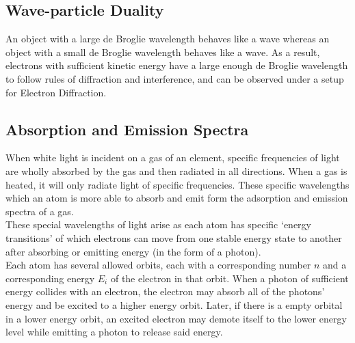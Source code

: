 \documentclass[../main]{subfiles}
\begin{document}
	\subsection{Wave-particle Duality}


	An object with a large de Broglie wavelength behaves like a wave whereas an object with a small de Broglie wavelength behaves like a wave. As a result, electrons with sufficient kinetic energy have a large enough de Broglie wavelength to follow rules of diffraction and interference, and can be observed under a setup for Electron Diffraction.

	\subsection{Absorption and Emission Spectra}

	When white light is incident on a gas of an element, specific frequencies of light are wholly absorbed by the gas and then radiated in all directions. When a gas is heated, it will only radiate light of specific frequencies. These specific wavelengths which an atom is more able to absorb and emit form the adsorption and emission spectra of a gas. \\

	These special wavelengths of light arise as each atom has specific `energy transitions' of which electrons can move from one stable energy state to another after absorbing or emitting energy (in the form of a photon). \\

	Each atom has several allowed orbits, each with a corresponding number \(n\) and a corresponding energy \(E_i\) of the electron in that orbit. When a photon of sufficient energy collides with an electron, the electron may absorb all of the photons' energy and be excited to a higher energy orbit. Later, if there is a empty orbital in a lower energy orbit, an excited electron may demote itself to the lower energy level while emitting a photon to release said energy. \\

\end{document}
